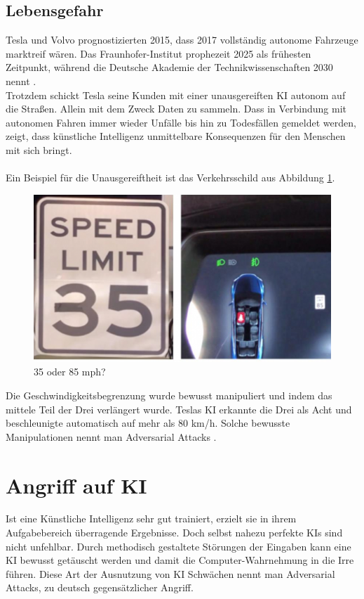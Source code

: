 \documentclass[12pt,oneside,a4paper,parskip]{scrbook}
\begin{document}
\subsection{Lebensgefahr}
Tesla und Volvo prognostizierten 2015, dass 2017 vollständig autonome Fahrzeuge marktreif wären. Das Fraunhofer-Institut prophezeit 2025 als frühesten Zeitpunkt, während die Deutsche Akademie der Technikwissenschaften 2030 nennt \cite{AutonomAuto}.
\\Trotzdem schickt Tesla seine Kunden mit einer unausgereiften KI autonom auf die Straßen. Allein mit dem Zweck Daten zu sammeln. Dass in Verbindung mit autonomen Fahren immer wieder Unfälle bis hin zu Todesfällen gemeldet werden, zeigt, dass künstliche Intelligenz unmittelbare Konsequenzen für den Menschen mit sich bringt. \\\\
Ein Beispiel für die Unausgereiftheit ist das Verkehrsschild aus Abbildung \ref{fig:Verkehrsschild}.  %
\begin{figure}[h]
	\begin{center}
		\includegraphics[width=15cm]{Bilder/Tesla_Adversarial_Attack.png}
		\caption{35 oder 85 mph?\cite{teslaCarImage}}
		\label{fig:Verkehrsschild}
	\end{center}
\end{figure}
Die Geschwindigkeitsbegrenzung wurde bewusst manipuliert und indem das mittele Teil der Drei verlängert wurde. Teslas KI erkannte die Drei als Acht und beschleunigte automatisch auf mehr als 80 km/h. Solche bewusste Manipulationen nennt man Adversarial Attacks \cite{TeslaHack}.
\section{Angriff auf KI}
Ist eine Künstliche Intelligenz sehr gut trainiert, erzielt sie in ihrem Aufgabebereich überragende Ergebnisse. Doch selbst nahezu perfekte KIs sind nicht unfehlbar. Durch methodisch gestaltete Störungen der Eingaben kann eine KI bewusst getäuscht werden und damit die Computer-Wahrnehmung in die Irre führen. Diese Art der Ausnutzung von KI Schwächen nennt man Adversarial Attacks, zu deutsch gegensätzlicher Angriff.
\end{document}
